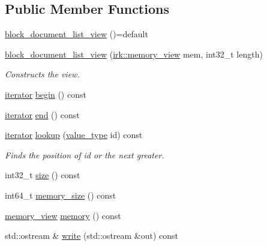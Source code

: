 \subsection*{Public Member Functions}
\begin{DoxyCompactItemize}
\item 
\mbox{\hyperlink{classirk_1_1index_1_1block__document__list__view_a9664030e51525833bbe188c0ffaf763e}{block\+\_\+document\+\_\+list\+\_\+view}} ()=default
\item 
\mbox{\hyperlink{classirk_1_1index_1_1block__document__list__view_a7618502e688a818d719a9bc939753390}{block\+\_\+document\+\_\+list\+\_\+view}} (\mbox{\hyperlink{classirk_1_1memory__view}{irk\+::memory\+\_\+view}} mem, int32\+\_\+t length)
\begin{DoxyCompactList}\small\item\em Constructs the view. \end{DoxyCompactList}\item 
\mbox{\hyperlink{classirk_1_1index_1_1block__document__list__view_afc4738502c6c0b43f8487be16136feec}{iterator}} \mbox{\hyperlink{classirk_1_1index_1_1block__document__list__view_a940c6d0b71559861f737e4cf83967d89}{begin}} () const
\item 
\mbox{\hyperlink{classirk_1_1index_1_1block__document__list__view_afc4738502c6c0b43f8487be16136feec}{iterator}} \mbox{\hyperlink{classirk_1_1index_1_1block__document__list__view_a436a88ad1c67c712c6b0aee63d28d1e4}{end}} () const
\item 
\mbox{\hyperlink{classirk_1_1index_1_1block__document__list__view_afc4738502c6c0b43f8487be16136feec}{iterator}} \mbox{\hyperlink{classirk_1_1index_1_1block__document__list__view_a5b34a202589c619eb9e2aec9043dfd02}{lookup}} (\mbox{\hyperlink{classirk_1_1index_1_1block__document__list__view_a06e2f36c5850de123fefa071ae56da92}{value\+\_\+type}} id) const
\begin{DoxyCompactList}\small\item\em Finds the position of {\ttfamily id} or the next greater. \end{DoxyCompactList}\item 
int32\+\_\+t \mbox{\hyperlink{classirk_1_1index_1_1block__document__list__view_ad54848af1d979186618564f0cb7dd598}{size}} () const
\item 
int64\+\_\+t \mbox{\hyperlink{classirk_1_1index_1_1block__document__list__view_a5d2794987db8ca0a090ffdf1cc6c235f}{memory\+\_\+size}} () const
\item 
\mbox{\hyperlink{classirk_1_1memory__view}{memory\+\_\+view}} \mbox{\hyperlink{classirk_1_1index_1_1block__document__list__view_a05d9aaf476ec8dc2a5077e5d549b8915}{memory}} () const
\item 
std\+::ostream \& \mbox{\hyperlink{classirk_1_1index_1_1block__document__list__view_a2e535fb377bac8f0332add83017eec01}{write}} (std\+::ostream \&out) const
\end{DoxyCompactItemize}
